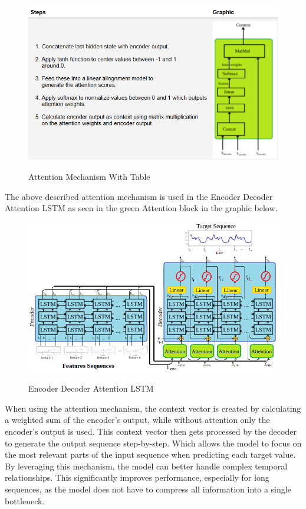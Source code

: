 \documentclass[a4paper]{article}
\begin{document}
    \begin{figure}
\centering
{\includegraphics[keepaspectratio]{src/attention_graphic_with_table.png}}
\caption{Attention Mechanism With Table}
\end{figure}

    The above described attention mechanism is used in the Encoder Decoder
Attention LSTM as seen in the green Attention block in the graphic
below.

    \begin{figure}
\centering
{\includegraphics[keepaspectratio]{src/enc_dec_att_LSTM_autoreg.png}}
\caption{Encoder Decoder Attention LSTM}
\end{figure}

    When using the attention mechanism, the context vector is created by
calculating a weighted sum of the encoder's output, while without
attention only the encoder's output is used. This context vector then
gets processed by the decoder to generate the output sequence
step-by-step. Which allows the model to focus on the most relevant parts
of the input sequence when predicting each target value. By leveraging
this mechanism, the model can better handle complex temporal
relationships. This significantly improves performance, especially for
long sequences, as the model does not have to compress all information
into a single bottleneck.
\end{document}
